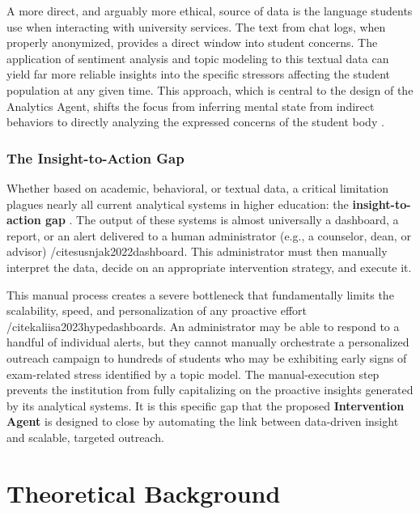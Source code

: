 A more direct, and arguably more ethical, source of data is the language students use when interacting with university services. The text from chat logs, when properly anonymized, provides a direct window into student concerns. The application of sentiment analysis and topic modeling to this textual data can yield far more reliable insights into the specific stressors affecting the student population at any given time. This approach, which is central to the design of the Analytics Agent, shifts the focus from inferring mental state from indirect behaviors to directly analyzing the expressed concerns of the student body \cite{paolucci2024wellbeinganalytics}.

\subsubsection{The Insight-to-Action Gap}
Whether based on academic, behavioral, or textual data, a critical limitation plagues nearly all current analytical systems in higher education: the \textbf{insight-to-action gap} \cite{jorno2018actionableinsight}. The output of these systems is almost universally a dashboard, a report, or an alert delivered to a human administrator (e.g., a counselor, dean, or advisor) /cite{susnjak2022dashboard}. This administrator must then manually interpret the data, decide on an appropriate intervention strategy, and execute it.

This manual process creates a severe bottleneck that fundamentally limits the scalability, speed, and personalization of any proactive effort /cite{kaliisa2023hypedashboards}. An administrator may be able to respond to a handful of individual alerts, but they cannot manually orchestrate a personalized outreach campaign to hundreds of students who may be exhibiting early signs of exam-related stress identified by a topic model. The manual-execution step prevents the institution from fully capitalizing on the proactive insights generated by its analytical systems. It is this specific gap that the proposed \textbf{Intervention Agent} is designed to close by automating the link between data-driven insight and scalable, targeted outreach.


\section{Theoretical Background}
\label{sec:theoretical_background}

